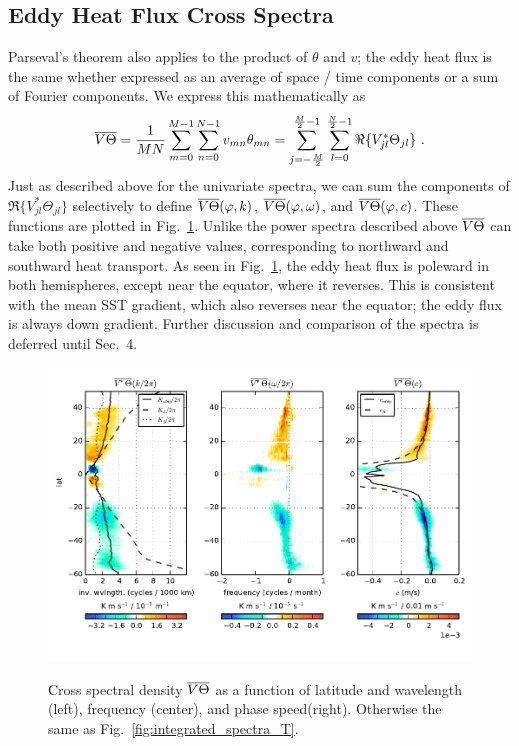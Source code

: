 \documentclass[10pt]{article}
\newcommand{\ol}{\ensuremath{\overline}}
\begin{document}
\subsection{Eddy Heat Flux Cross Spectra}

Parseval's theorem also applies to the product of $\theta$ and $v$; the eddy heat flux is the same whether expressed as an average of space / time components or a sum of Fourier components. We express this mathematically as
\begin{equation}
\ol{V\Theta} = \frac{1}{MN} \sum_{m=0}^{M-1} \sum_{n=0}^{N-1} v_{mn} \theta_{mn} = \sum_{j=-\frac{M}{2}}^{\frac{M}{2}-1} \sum_{l=0}^{\frac{N}{2}-1} \Re \{ V_{jl}^\ast  \Theta_{jl} \} \ .
\end{equation}
Just as described above for the univariate spectra, we can sum the components of $\Re \{ V_{jl}^\ast  \Theta_{jl} \}$ selectively to define $\ol{V\Theta}(\varphi, k)$, $\ol{V\Theta}(\varphi, \omega)$, and $\ol{V\Theta}(\varphi, c)$. These functions are plotted in  Fig.~\ref{fig:integrated_spectra_VT}. Unlike the power spectra described above $\ol{V\Theta}$ can take both positive and negative values, corresponding to northward and southward heat transport. As seen in Fig.~\ref{fig:integrated_spectra_VT}, the eddy heat flux is poleward in both hemispheres, except near the equator, where it reverses. This is consistent with the mean SST gradient, which also reverses near the equator; the eddy flux is always down gradient. Further discussion and comparison of the spectra is deferred until Sec.~4.  %

\begin{figure}[t]
  \noindent\includegraphics{../figures/SAT_50degwide/integrated_spectra_VT.pdf}\\
  \caption{Cross spectral density $\ol{V\Theta}$  as a function of latitude and wavelength (left), frequency (center), and phase speed(right). Otherwise the same as Fig.~\ref{fig:integrated_spectra_T}.}
  \label{fig:integrated_spectra_VT}
\end{figure}
\end{document}
